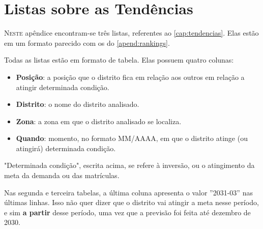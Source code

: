 \chapter{Listas sobre as Tendências}
\label{apend:tendencias}

\lettrine{N}{este} apêndice encontram-se três listas, referentes ao \autoref{cap:tendencias}. Elas estão em um formato parecido com os do \autoref{apend:rankings}.

Todas as listas estão em formato de tabela. Elas possuem quatro colunas:
 
\begin{itemize}
	\item \textbf{Posição}: a posição que o distrito fica em relação aos outros em relação a atingir determinada condição.
	\item \textbf{Distrito}: o nome do distrito analisado.
	\item \textbf{Zona}: a zona em que o distrito analisado se localiza.
	\item \textbf{Quando}: momento, no formato MM/AAAA, em que o distrito atinge (ou atingirá) determinada condição.
\end{itemize}

"Determinada condição", escrita acima, se refere à inversão, ou o atingimento da meta da demanda ou das matrículas.

Nas segunda e terceira tabelas, a última coluna apresenta o valor ''2031-03'' nas últimas linhas. Isso não quer dizer que o distrito vai atingir a meta nesse período, e sim \textbf{a partir} desse período, uma vez que a previsão foi feita até dezembro de 2030.